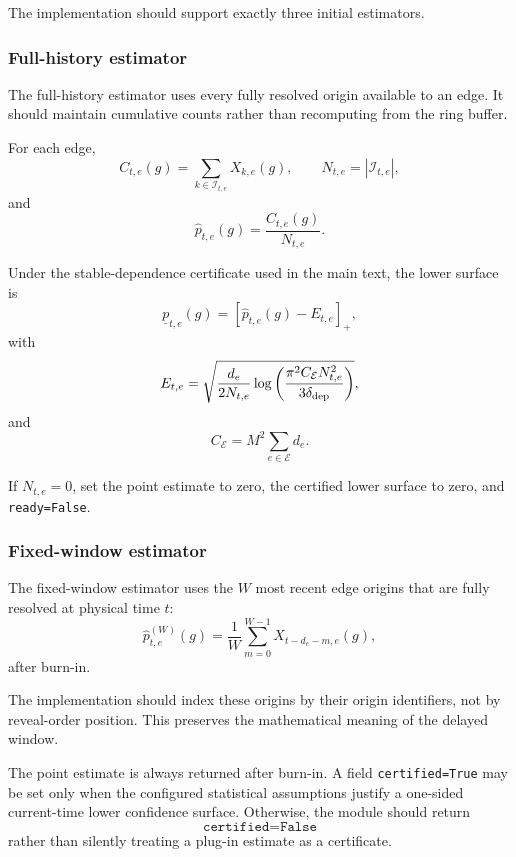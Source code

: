 \documentclass[11pt]{article}
\begin{document}
The implementation should support exactly three initial estimators.

\subsubsection{Full-history estimator}

The full-history estimator uses every fully resolved origin available to an
edge.  It should maintain cumulative counts rather than recomputing from the
ring buffer.

For each edge,
\[
    C_{t,e}(g)
    =
    \sum_{k\in\mathcal I_{t,e}}
    X_{k,e}(g),
    \qquad
    N_{t,e}
    =
    |\mathcal I_{t,e}|,
\]
and
\[
    \widehat p_{t,e}(g)
    =
    \frac{C_{t,e}(g)}{N_{t,e}}.
\]

Under the stable-dependence certificate used in the main text, the lower
surface is
\[
    \underline p_{t,e}(g)
    =
    \left[
        \widehat p_{t,e}(g)-E_{t,e}
    \right]_+,
\]
with
\[
    E_{t,e}
    =
    \sqrt{
        \frac{d_e}{2N_{t,e}}
        \log
        \left(
            \frac{
                \pi^2 C_{\mathcal E}N_{t,e}^2
            }{
                3\delta_{\rm dep}
            }
        \right)
    },
\]
and
\[
    C_{\mathcal E}
    =
    M^2\sum_{e\in\mathcal E}d_e.
\]

If $N_{t,e}=0$, set the point estimate to zero, the certified lower surface
to zero, and \texttt{ready=False}.

\subsubsection{Fixed-window estimator}

The fixed-window estimator uses the $W$ most recent edge origins that are
fully resolved at physical time $t$:
\[
    \widehat p^{(W)}_{t,e}(g)
    =
    \frac1W
    \sum_{m=0}^{W-1}
    X_{t-d_e-m,e}(g),
\]
after burn-in.

The implementation should index these origins by their origin identifiers,
not by reveal-order position.  This preserves the mathematical meaning of the
delayed window.

The point estimate is always returned after burn-in.  A field
\texttt{certified=True} may be set only when the configured statistical
assumptions justify a one-sided current-time lower confidence surface.
Otherwise, the module should return
\[
    \texttt{certified=False}
\]
rather than silently treating a plug-in estimate as a certificate.
\end{document}
